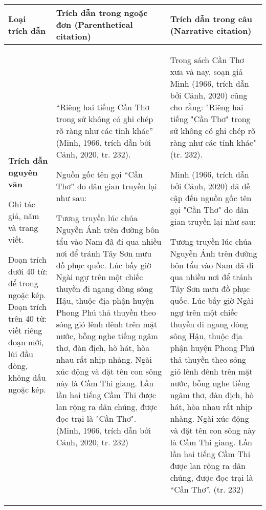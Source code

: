  \begin{table*}
\centering
\begin{tabular}{|l|l|l|}
    \hline
      Loại trích dẫn   & Trích dẫn trong ngoặc đơn (Parenthetical citation) & Trích dẫn trong câu 
(Narrative citation)
\\
     \hline       
     \textbf{Trích dẫn nguyên văn}
     
Ghi tác giả, năm và trang viết.

Đoạn trích dưới 40 từ: để trong ngoặc kép.
Đoạn trích trên 40 từ: viết riêng đoạn mới, lùi đầu dòng, không dấu ngoặc kép.
    & ``Riêng hai tiếng Cần Thơ trong sử không có ghi chép rõ ràng như các tỉnh khác'' (Minh, 1966, trích dẫn bởi Cảnh, 2020, tr. 232). 

Nguồn gốc tên gọi ``Cần Thơ'' do dân gian truyền lại như sau:

Tương truyền lúc chúa Nguyễn Ánh trên đường bôn tẩu vào Nam đã đi qua nhiều nơi để tránh Tây Sơn mưu đồ phục quốc. Lúc bấy giờ Ngài ngự trên một chiếc thuyền đi ngang dòng sông Hậu, thuộc địa phận huyện Phong Phú thả thuyền theo sóng gió lênh đênh trên mặt nước, bỗng nghe tiếng ngâm thơ, đàn địch, hò hát, hòa nhau rất nhịp nhàng. Ngài xúc động và đặt tên con sông này là Cầm Thi giang. Lần lần hai tiếng Cầm Thi được lan rộng ra dân chúng, được đọc trại là "Cần Thơ". (Minh, 1966, trích dẫn bởi Cảnh, 2020, tr. 232)
 & Trong sách Cần Thơ xưa và nay, soạn giả Minh (1966, trích dẫn bởi Cảnh, 2020) cũng cho rằng: "Riêng hai tiếng "Cần Thơ" trong sử không có ghi chép rõ ràng như các tỉnh khác" (tr. 232). 

Minh (1966, trích dẫn bởi Cảnh, 2020) đã đề cập đến nguồn gốc tên gọi "Cần Thơ" do dân gian truyền lại như sau:

Tương truyền lúc chúa Nguyễn Ánh trên đường bôn tẩu vào Nam đã đi qua nhiều nơi để tránh Tây Sơn mưu đồ phục quốc. Lúc bấy giờ Ngài ngự trên một chiếc thuyền đi ngang dòng sông Hậu, thuộc địa phận huyện Phong Phú thả thuyền theo sóng gió lênh đênh trên mặt nước, bỗng nghe tiếng ngâm thơ, đàn địch, hò hát, hòa nhau rất nhịp nhàng. Ngài xúc động và đặt tên con sông này là Cầm Thi giang. Lần lần hai tiếng Cầm Thi được lan rộng ra dân chúng, được đọc trại là ``Cần Thơ''. (tr. 232)
\\
         \hline
    \end{tabular}
\end{table*}
